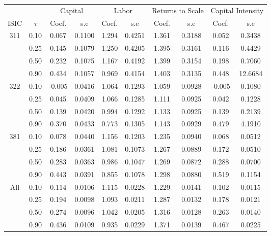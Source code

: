 \begin{table}[H]
\centering
\begin{tabular}{cccccccccc}
  \hline\hline & & \multicolumn{2}{c}{Capital}  & \multicolumn{2}{c}{Labor} & \multicolumn{2}{c}{Returns to Scale} & \multicolumn{2}{c}{Capital Intensity}\\ \cmidrule(lr){3-4} \cmidrule(lr){5-6} \cmidrule(lr){7-8} \cmidrule(lr){9-10}ISIC & $\tau$ & Coef. & s.e & Coef. & s.e & Coef. & s.e & Coef. & s.e \\ 
  \hline
311 & 0.10 & 0.067 & 0.1100 & 1.294 & 0.4251 & 1.361 & 0.3188 & 0.052 & 0.3438 \\ 
   & 0.25 & 0.145 & 0.1079 & 1.250 & 0.4205 & 1.395 & 0.3161 & 0.116 & 0.4429 \\ 
   & 0.50 & 0.232 & 0.1075 & 1.167 & 0.4192 & 1.399 & 0.3154 & 0.198 & 0.7060 \\ 
   & 0.90 & 0.434 & 0.1057 & 0.969 & 0.4154 & 1.403 & 0.3135 & 0.448 & 12.6684 \\ 
  322 & 0.10 & -0.005 & 0.0416 & 1.064 & 0.1293 & 1.059 & 0.0928 & -0.005 & 0.1080 \\ 
   & 0.25 & 0.045 & 0.0409 & 1.066 & 0.1285 & 1.111 & 0.0925 & 0.042 & 0.1228 \\ 
   & 0.50 & 0.139 & 0.0420 & 0.994 & 0.1292 & 1.133 & 0.0925 & 0.139 & 0.2139 \\ 
   & 0.90 & 0.370 & 0.0433 & 0.773 & 0.1305 & 1.143 & 0.0929 & 0.479 & 4.1910 \\ 
  381 & 0.10 & 0.078 & 0.0440 & 1.156 & 0.1203 & 1.235 & 0.0940 & 0.068 & 0.0512 \\ 
   & 0.25 & 0.186 & 0.0361 & 1.081 & 0.1073 & 1.267 & 0.0889 & 0.172 & 0.0510 \\ 
   & 0.50 & 0.283 & 0.0363 & 0.986 & 0.1047 & 1.269 & 0.0872 & 0.288 & 0.0700 \\ 
   & 0.90 & 0.443 & 0.0391 & 0.855 & 0.1078 & 1.298 & 0.0880 & 0.519 & 0.1154 \\ 
  All & 0.10 & 0.114 & 0.0106 & 1.115 & 0.0228 & 1.229 & 0.0141 & 0.102 & 0.0115 \\ 
   & 0.25 & 0.194 & 0.0098 & 1.093 & 0.0211 & 1.287 & 0.0132 & 0.178 & 0.0121 \\ 
   & 0.50 & 0.274 & 0.0096 & 1.042 & 0.0205 & 1.316 & 0.0128 & 0.263 & 0.0140 \\ 
   & 0.90 & 0.436 & 0.0109 & 0.935 & 0.0229 & 1.371 & 0.0139 & 0.467 & 0.0225 \\ 
   \hline
\end{tabular}
\end{table}
